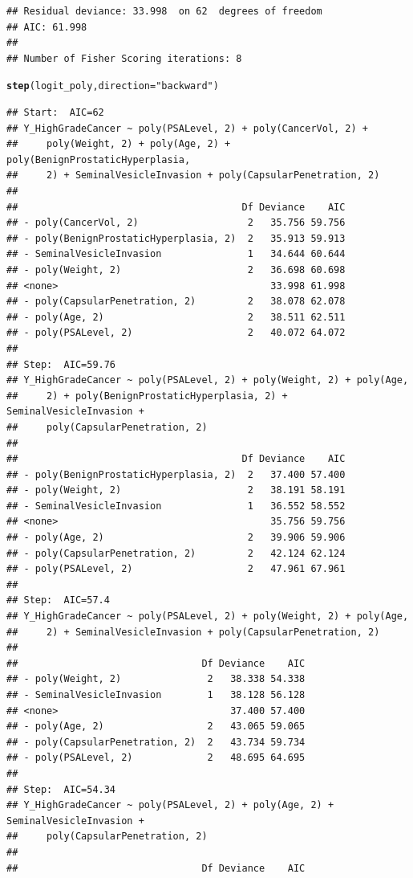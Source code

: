 \documentclass{article}\usepackage[]{graphicx}\usepackage[]{color}
\makeatletter
\newcommand{\hlstr}[1]{\textcolor[rgb]{0.192,0.494,0.8}{#1}}%
\newcommand{\hlstd}[1]{\textcolor[rgb]{0.345,0.345,0.345}{#1}}%
\newcommand{\hlkwc}[1]{\textcolor[rgb]{0.333,0.667,0.333}{#1}}%
\newcommand{\hlkwd}[1]{\textcolor[rgb]{0.737,0.353,0.396}{\textbf{#1}}}%
\newenvironment{kframe}{%
 \def\at@end@of@kframe{}%
 \ifinner\ifhmode%
  \def\at@end@of@kframe{\end{minipage}}%
  \begin{minipage}{\columnwidth}%
 \fi\fi%
 \def\FrameCommand##1{\hskip\@totalleftmargin \hskip-\fboxsep
 \colorbox{shadecolor}{##1}\hskip-\fboxsep
     \hskip-\linewidth \hskip-\@totalleftmargin \hskip\columnwidth}%
 \MakeFramed {\advance\hsize-\width
   \@totalleftmargin\z@ \linewidth\hsize
   \@setminipage}}%
 {\par\unskip\endMakeFramed%
 \at@end@of@kframe}
\newenvironment{knitrout}{}{} %
\makeatother
\begin{document}
\begin{knitrout}
\begin{kframe}
\begin{verbatim}
## Residual deviance: 33.998  on 62  degrees of freedom
## AIC: 61.998
## 
## Number of Fisher Scoring iterations: 8
\end{verbatim}
\begin{alltt}
\hlkwd{step}\hlstd{(logit_poly,} \hlkwc{direction}\hlstd{=}\hlstr{"backward"}\hlstd{)}
\end{alltt}
\begin{verbatim}
## Start:  AIC=62
## Y_HighGradeCancer ~ poly(PSALevel, 2) + poly(CancerVol, 2) + 
##     poly(Weight, 2) + poly(Age, 2) + poly(BenignProstaticHyperplasia, 
##     2) + SeminalVesicleInvasion + poly(CapsularPenetration, 2)
## 
##                                       Df Deviance    AIC
## - poly(CancerVol, 2)                   2   35.756 59.756
## - poly(BenignProstaticHyperplasia, 2)  2   35.913 59.913
## - SeminalVesicleInvasion               1   34.644 60.644
## - poly(Weight, 2)                      2   36.698 60.698
## <none>                                     33.998 61.998
## - poly(CapsularPenetration, 2)         2   38.078 62.078
## - poly(Age, 2)                         2   38.511 62.511
## - poly(PSALevel, 2)                    2   40.072 64.072
## 
## Step:  AIC=59.76
## Y_HighGradeCancer ~ poly(PSALevel, 2) + poly(Weight, 2) + poly(Age, 
##     2) + poly(BenignProstaticHyperplasia, 2) + SeminalVesicleInvasion + 
##     poly(CapsularPenetration, 2)
## 
##                                       Df Deviance    AIC
## - poly(BenignProstaticHyperplasia, 2)  2   37.400 57.400
## - poly(Weight, 2)                      2   38.191 58.191
## - SeminalVesicleInvasion               1   36.552 58.552
## <none>                                     35.756 59.756
## - poly(Age, 2)                         2   39.906 59.906
## - poly(CapsularPenetration, 2)         2   42.124 62.124
## - poly(PSALevel, 2)                    2   47.961 67.961
## 
## Step:  AIC=57.4
## Y_HighGradeCancer ~ poly(PSALevel, 2) + poly(Weight, 2) + poly(Age, 
##     2) + SeminalVesicleInvasion + poly(CapsularPenetration, 2)
## 
##                                Df Deviance    AIC
## - poly(Weight, 2)               2   38.338 54.338
## - SeminalVesicleInvasion        1   38.128 56.128
## <none>                              37.400 57.400
## - poly(Age, 2)                  2   43.065 59.065
## - poly(CapsularPenetration, 2)  2   43.734 59.734
## - poly(PSALevel, 2)             2   48.695 64.695
## 
## Step:  AIC=54.34
## Y_HighGradeCancer ~ poly(PSALevel, 2) + poly(Age, 2) + SeminalVesicleInvasion + 
##     poly(CapsularPenetration, 2)
## 
##                                Df Deviance    AIC

\end{verbatim}
\end{kframe}
\end{knitrout}
\end{document}

